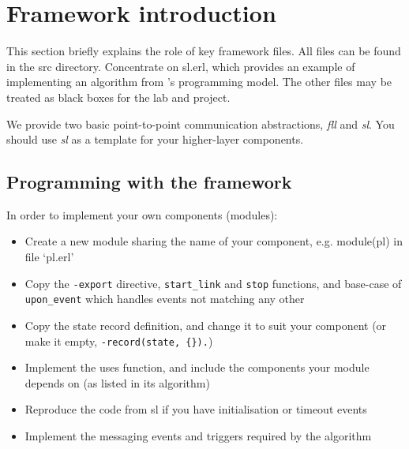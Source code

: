 \documentclass[a4paper]{article}
\begin{document}



\section{Framework introduction} %
\label{sec:framework_overview}

This section briefly explains the role of key framework files. All files can
be found in the src directory. Concentrate on sl.erl, which provides
an example of implementing an algorithm from \cite{cachin2011}'s programming
model. The other files may be treated as black boxes for the lab and
project.

We provide two basic point-to-point communication abstractions,
\emph{fll} and \emph{sl}. You should use \emph{sl} as a template for your
higher-layer components.

\subsection{Programming with the framework} %
\label{sub:api}

In order to implement your own components (modules):

\begin{itemize}

\item Create a new module sharing the name of your component, e.g. module(pl)
in file `pl.erl'

\item Copy the \verb!-export! directive, \verb!start_link! and \verb!stop!
functions, and base-case of \verb!upon_event! which handles events not
matching any other

\item Copy the state record definition, and change it to suit your component
(or make it empty, \verb!-record(state, {}).!)

\item Implement the uses function, and include the components your module
depends on (as listed in its algorithm)

\item Reproduce the code from sl if you have initialisation or timeout events

\item Implement the messaging events and triggers required by the algorithm

\end{itemize}
\end{document}
